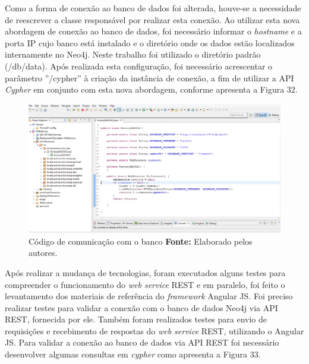\par Como a forma de conexão ao banco de dados foi alterada, houve-se a necessidade de reescrever a classe responsável por realizar esta conexão. Ao utilizar esta nova abordagem de conexão ao banco de dados, foi necessário informar o \textit{hostname} e a porta IP cujo banco está instalado e o diretório onde os dados estão localizados internamente no Neo4j. Neste trabalho foi utilizado o diretório padrão (/db/data). Após realizada esta configuração, foi necessário acrescentar o parâmetro ''/cypher'' à criação da instância de conexão, a fim de utilizar a API \textit{Cypher} em conjunto com esta nova abordagem, conforme apresenta a Figura 32.

\begin{figure}[h!]
	\centerline{\includegraphics[scale=0.35]{./imagens/conexao-banco.jpg}}
	\caption[Código de comunicação com o banco]
	{Código de comunicação com o banco \textbf{Fonte:} Elaborado pelos autores.}
	\label{fig:exemplo1}
\end{figure}

\par Após realizar a mudança de tecnologias, foram executados alguns testes para compreender o funcionamento do \textit{web service} REST e em paralelo, foi feito o levantamento dos materiais de referência do \textit{framework} Angular JS. Foi preciso realizar testes para validar a conexão com o banco de dados Neo4j via API REST, fornecida por ele. Também foram realizados testes para envio de requisições e recebimento de respostas do \textit{web service} REST, utilizando o Angular JS. Para validar a conexão ao banco de dados via API REST foi necessário desenvolver algumas consultas em \textit{cypher} como apresenta a Figura 33.

